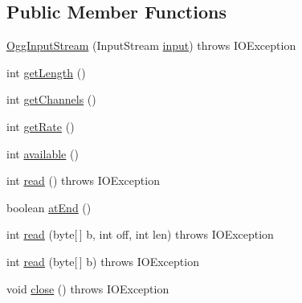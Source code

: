 \subsection*{Public Member Functions}
\begin{DoxyCompactItemize}
\item 
\mbox{\hyperlink{classorg_1_1newdawn_1_1slick_1_1openal_1_1_ogg_input_stream_a51094c8847e2ffa7765a3cbc4e6c4925}{Ogg\+Input\+Stream}} (Input\+Stream \mbox{\hyperlink{classorg_1_1newdawn_1_1slick_1_1openal_1_1_ogg_input_stream_ab6f4422dccd66dff43b69cf84f9bb791}{input}})  throws I\+O\+Exception 
\item 
int \mbox{\hyperlink{classorg_1_1newdawn_1_1slick_1_1openal_1_1_ogg_input_stream_a6f68d59f87324ed01d07316dadc66c41}{get\+Length}} ()
\item 
int \mbox{\hyperlink{classorg_1_1newdawn_1_1slick_1_1openal_1_1_ogg_input_stream_a63a29d47878503e310d5ea4686751596}{get\+Channels}} ()
\item 
int \mbox{\hyperlink{classorg_1_1newdawn_1_1slick_1_1openal_1_1_ogg_input_stream_ae742f942523c3ec33053a494ee3f5050}{get\+Rate}} ()
\item 
int \mbox{\hyperlink{classorg_1_1newdawn_1_1slick_1_1openal_1_1_ogg_input_stream_a630130dcbd8725342e3d798670481981}{available}} ()
\item 
int \mbox{\hyperlink{classorg_1_1newdawn_1_1slick_1_1openal_1_1_ogg_input_stream_a66397cab8bce3c41ce7bcb4447a66a46}{read}} ()  throws I\+O\+Exception 
\item 
boolean \mbox{\hyperlink{classorg_1_1newdawn_1_1slick_1_1openal_1_1_ogg_input_stream_a66f42d8e0d5b2c31d638b065f2f3ea46}{at\+End}} ()
\item 
int \mbox{\hyperlink{classorg_1_1newdawn_1_1slick_1_1openal_1_1_ogg_input_stream_ab03aec502a7165b31f7fcb1fbb596a5f}{read}} (byte\mbox{[}$\,$\mbox{]} b, int off, int len)  throws I\+O\+Exception 
\item 
int \mbox{\hyperlink{classorg_1_1newdawn_1_1slick_1_1openal_1_1_ogg_input_stream_a48f59c921cfd04be1f0b1f18f2fcda0a}{read}} (byte\mbox{[}$\,$\mbox{]} b)  throws I\+O\+Exception 
\item 
void \mbox{\hyperlink{classorg_1_1newdawn_1_1slick_1_1openal_1_1_ogg_input_stream_a7b9b6debc212b7f5bb2fdc6a94516fd0}{close}} ()  throws I\+O\+Exception 
\end{DoxyCompactItemize}
